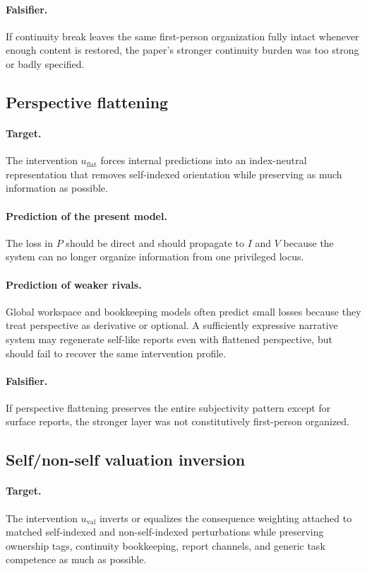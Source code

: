 \documentclass[11pt,a4paper]{article}
\theoremstyle{definition}
\newcommand{\SelfIndex}{I}
\newcommand{\Persp}{P}
\newcommand{\ValAsym}{V}
\begin{document}
\paragraph{Falsifier.} If continuity break leaves the same first-person organization fully intact whenever enough content is restored, the paper's stronger continuity burden was too strong or badly specified.

\subsection{Perspective flattening}
\paragraph{Target.} The intervention $u_{\mathrm{flat}}$ forces internal predictions into an index-neutral representation that removes self-indexed orientation while preserving as much information as possible.

\paragraph{Prediction of the present model.} The loss in $\Persp$ should be direct and should propagate to $\SelfIndex$ and $\ValAsym$ because the system can no longer organize information from one privileged locus.

\paragraph{Prediction of weaker rivals.} Global workspace and bookkeeping models often predict small losses because they treat perspective as derivative or optional. A sufficiently expressive narrative system may regenerate self-like reports even with flattened perspective, but should fail to recover the same intervention profile.

\paragraph{Falsifier.} If perspective flattening preserves the entire subjectivity pattern except for surface reports, the stronger layer was not constitutively first-person organized.

\subsection{Self/non-self valuation inversion}
\paragraph{Target.} The intervention $u_{\mathrm{val}}$ inverts or equalizes the consequence weighting attached to matched self-indexed and non-self-indexed perturbations while preserving ownership tags, continuity bookkeeping, report channels, and generic task competence as much as possible.
\end{document}
